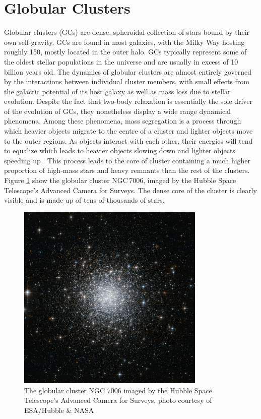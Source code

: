 
\section{Globular Clusters}


Globular clusters (GCs) are dense, spheroidal collection of stars bound by their own self-gravity.
GCs are found in most galaxies, with the Milky Way hosting roughly 150, mostly located in the outer
halo. GCs typically represent some of the oldest stellar populations in the universe and are usually
in excess of 10 billion years old. The dynamics of globular clusters are almost entirely governed by
the interactions between individual cluster members, with small effects from the galactic potential
of its host galaxy as well as mass loss due to stellar evolution. Despite the fact that two-body
relaxation is essentially the sole driver of the evolution of GCs, they nonetheless display a wide
range dynamical phenomena. Among these phenomena, mass segregation is a process through which
heavier objects migrate to the centre of a cluster and lighter objects move to the outer regions. As
objects interact with each other, their energies will tend to equalize which leads to heavier
objects slowing down and lighter objects speeding up \citep{Heggie2003}. This process leads to the
core of cluster containing a much higher proportion of high-mass stars and heavy remnants than the
rest of the clusters. Figure \ref{fig:1/ngc7006} show the globular cluster NGC\,7006, imaged by the
Hubble Space Telescope's Advanced Camera for Surveys. The dense core of the cluster is clearly
visible and is made up of tens of thousands of stars.

\begin{figure}
	\centering
	\includegraphics[width=0.8\textwidth]{figures/c42.jpg}
	\caption{The globular cluster NGC 7006 imaged by the Hubble Space Telescope's Advanced
		Camera for Surveys, photo courtesy of ESA/Hubble \& NASA}
	\label{fig:1/ngc7006}
\end{figure}



